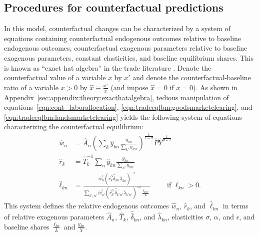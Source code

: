 \documentclass[11pt]{article}
\theoremstyle{definition}
\begin{document}
\subsection{Procedures for counterfactual predictions}\label{sec:cont_model:counter}

In this model, counterfactual changes can be characterized by a system of equations containing
counterfactual endogenous outcomes relative to baseline endogenous outcomes,
counterfactual exogenous parameters relative to baseline exogenous parameters,
constant elasticities, 
and
baseline equilibrium shares.
This is known as ``exact hat algebra'' in the trade literature \citep{DekleEatonKortum:2008,CostinotRodriguez-Clare:2014}.
Denote the counterfactual value of a variable $x$ by $x'$
and
denote the counterfactual-baseline ratio of a variable $x>0$ by $\hat{x}\equiv \frac{x'}{x}$
(and impose $\hat{x} = 0$ if $x=0$).
As shown in Appendix~\ref{sec:appendix:theory:exacthatalgebra},
tedious manipulation of equations~\eqref{eqn:cont_laborallocation}, \eqref{eqn:tradeeqlbm:goodsmarketclearing}, and \eqref{eqn:tradeeqlbm:landsmarketclearing}
yields the following system of equations characterizing the counterfactual equilibrium:
\begin{align}
\hat{w}_{n}
&=
\hat{A}_n
\left(\sum_{k} \hat{y}_{kn}\frac{y_{kn}}{\sum_{k'} y_{k'n}}\right)^{\frac{1}{1-\sigma}}
\hat{P}
\hat{Y}^{\frac{1}{\sigma-1}}
\label{eqn:exacthatalgebra:wages}
\\
\hat{r}_{k}
&=
\hat{T}_{k}^{-1} \sum_{n}\hat{y}_{kn}\frac{y_{kn}}{\sum_{n'}y_{kn'}}
\label{eqn:exacthatalgebra:rents}
\\
\hat{\ell}_{kn} 
&=
\frac{\hat{w}_{n}^{\epsilon}\left(\hat{r}_{k}^{\alpha} \hat{\bar{\delta}}_{kn}\hat{ \lambda}_{kn} \right)^{-\epsilon}}{\sum_{k',n'} \hat{w}_{n'}^{\epsilon}\left(\hat{r}_{k'}^{\alpha} \hat{\bar{\delta}}_{k'n'}\hat{ \lambda}_{k'n'} \right)^{-\epsilon} \frac{\ell_{k'n'}}{L}} \qquad \text{ if } \ell_{kn} > 0
\label{eqn:exacthatalgebra:laborallocation}
.\end{align}
This system defines the relative endogenous outcomes
$\hat{w}_n$, $\hat{r}_k$, and $\hat{\ell}_{kn}$
in terms of
relative exogenous parameters
$\hat{A}_{n}$, $\hat{T}_{k}$, $\hat{\bar{\delta}}_{kn}$, and $\hat{\lambda}_{kn}$,
elasticities $\sigma$, $\alpha$, and $\epsilon$,
and
baseline shares $\frac{\ell_{kn}}{L}$ and $\frac{y_{kn}}{Y}$.
\end{document}
